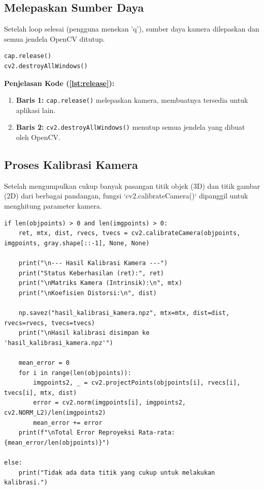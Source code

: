 \documentclass[12pt,a4paper]{article}
\begin{document}
\subsection{Melepaskan Sumber Daya}
Setelah loop selesai (pengguna menekan 'q'), sumber daya kamera dilepaskan dan
semua jendela OpenCV ditutup.

\begin{lstlisting}[caption=Melepaskan Sumber Daya, label=lst:release]
cap.release()
cv2.destroyAllWindows()
\end{lstlisting}

\textbf{Penjelasan Kode (\ref{lst:release}):}
\begin{enumerate}[label={},itemsep=0cm]
    \item \textbf{Baris 1:} \texttt{cap.release()} melepaskan kamera, membuatnya tersedia untuk aplikasi lain.
    \item \textbf{Baris 2:} \texttt{cv2.destroyAllWindows()} menutup semua jendela yang dibuat oleh OpenCV.
\end{enumerate}

\subsection{Proses Kalibrasi Kamera}
Setelah mengumpulkan cukup banyak pasangan titik objek (3D) dan titik gambar
(2D) dari berbagai pandangan, fungsi `cv2.calibrateCamera()` dipanggil untuk
menghitung parameter kamera.

\begin{lstlisting}[caption=Kalibrasi Kamera, label=lst:calibrate]
if len(objpoints) > 0 and len(imgpoints) > 0:
    ret, mtx, dist, rvecs, tvecs = cv2.calibrateCamera(objpoints, imgpoints, gray.shape[::-1], None, None)

    print("\n--- Hasil Kalibrasi Kamera ---")
    print("Status Keberhasilan (ret):", ret)
    print("\nMatriks Kamera (Intrinsik):\n", mtx)
    print("\nKoefisien Distorsi:\n", dist)

    np.savez("hasil_kalibrasi_kamera.npz", mtx=mtx, dist=dist, rvecs=rvecs, tvecs=tvecs)
    print("\nHasil kalibrasi disimpan ke 'hasil_kalibrasi_kamera.npz'")

    mean_error = 0
    for i in range(len(objpoints)):
        imgpoints2, _ = cv2.projectPoints(objpoints[i], rvecs[i], tvecs[i], mtx, dist)
        error = cv2.norm(imgpoints[i], imgpoints2, cv2.NORM_L2)/len(imgpoints2)
        mean_error += error
    print(f"\nTotal Error Reproyeksi Rata-rata: {mean_error/len(objpoints)}")

else:
    print("Tidak ada data titik yang cukup untuk melakukan kalibrasi.")
\end{lstlisting}
\end{document}

